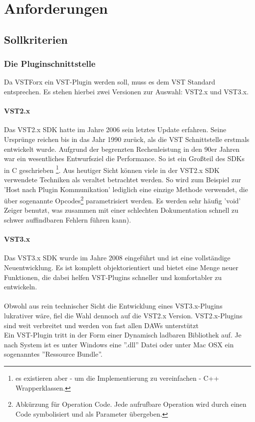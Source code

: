 \section{\label{kapAnforderungen}Anforderungen}
\subsection{Sollkriterien}
\subsubsection{Die Pluginschnittstelle}
Da VSTForx ein VST-Plugin werden soll, muss es dem VST Standard entsprechen. Es stehen hierbei zwei Versionen zur Auswahl: VST2.x und VST3.x.
\paragraph{VST2.x}
Das VST2.x SDK hatte im Jahre 2006 sein letztes Update erfahren. Seine Ursprünge reichen bis in das Jahr 1990 zurück, als die VST Schnittstelle erstmals entwickelt wurde. Aufgrund der begrenzten Rechenleistung in den 90er Jahren war ein wesentliches Entwurfsziel die Performance. So ist ein Großteil des SDKs in C geschrieben \footnote{es existieren aber - um die Implementierung zu vereinfachen - C++ Wrapperklassen.}.
Aus heutiger Sicht können viele in der VST2.x SDK verwendete Techniken als veraltet betrachtet werden. So wird zum Beispiel zur 'Host nach Plugin Kommunikation' lediglich eine einzige Methode verwendet, die über sogenannte Opcodes\footnote{Abkürzung für Operation Code. Jede aufrufbare Operation wird durch einen Code symbolisiert und als Parameter übergeben.} parametrisiert werden. Es werden sehr häufig 'void' Zeiger benutzt, was zusammen mit einer schlechten Dokumentation schnell zu schwer auffindbaren Fehlern führen kann). 
\paragraph{VST3.x}
Das VST3.x SDK wurde im Jahre 2008 eingeführt und ist eine vollständige Neuentwicklung. Es ist komplett objektorientiert und bietet eine Menge neuer Funktionen, die dabei helfen VST-Plugins schneller und komfortabler zu entwickeln. 
\\\\
Obwohl aus rein technischer Sicht die Entwicklung eines VST3.x-Plugins lukrativer wäre, fiel die Wahl dennoch auf die VST2.x Version. VST2.x-Plugins sind weit verbreitet und werden von fast allen DAWs unterstützt\\
Ein VST-Plugin tritt in der Form einer Dynamisch ladbaren Bibliothek auf. Je nach System ist es unter Windows eine ''.dll'' Datei oder unter Mac OSX ein sogenanntes ''Ressource Bundle''. 
